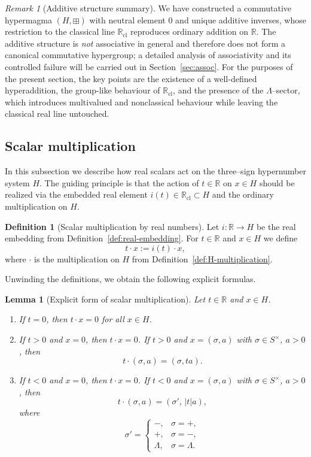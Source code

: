 \documentclass[11pt]{amsart}
\numberwithin{equation}{section}
\newtheorem{lemma}[theorem]{Lemma}
\theoremstyle{definition}
\newtheorem{definition}[theorem]{Definition}
\theoremstyle{remark}
\newtheorem{remark}[theorem]{Remark}
\newcommand{\R}{\mathbb{R}}
\newcommand{\Rc}{\mathbb{R}_{\mathrm{cl}}} %
\newcommand{\Hnum}{H}                      %
\newcommand{\Snon}{S^{\times}}             %
\newcommand{\op}{\boxplus}                 %
\newcommand{\iemb}{i}                      %
\begin{document}
\begin{remark}[Additive structure summary]\label{rem:H-add-summary}
We have constructed a commutative hypermagma $(\Hnum,\op)$ with
neutral element $0$ and unique additive inverses, whose restriction to
the classical line $\Rc$ reproduces ordinary addition on $\R$.  The
additive structure is \emph{not} associative in general and therefore
does not form a canonical commutative hypergroup; a detailed analysis
of associativity and its controlled failure will be carried out in
Section~\ref{sec:assoc}.  For the purposes of the present section, the
key points are the existence of a well-defined hyperaddition, the
group-like behaviour of $\Rc$, and the presence of the $\Lambda$--sector,
which introduces multivalued and nonclassical behaviour while leaving
the classical real line untouched.
\end{remark}

\subsection{Scalar multiplication}
\label{subsec:scalar}

In this subsection we describe how real scalars act on the
three--sign hypernumber system $\Hnum$.  The guiding principle is that
the action of $t\in\R$ on $x\in\Hnum$ should be realized via the
embedded real element $\iemb(t)\in\Rc\subset\Hnum$ and the ordinary
multiplication on $\Hnum$.

\begin{definition}[Scalar multiplication by real numbers]
\label{def:scalar-mult}
Let $\iemb:\R\to\Hnum$ be the real embedding from
Definition~\ref{def:real-embedding}.  For $t\in\R$ and $x\in\Hnum$ we
define
\[
  t\cdot x := \iemb(t)\cdot x,
\]
where $\cdot$ is the multiplication on $\Hnum$ from
Definition~\ref{def:H-multiplication}.
\end{definition}

Unwinding the definitions, we obtain the following explicit formulas.

\begin{lemma}[Explicit form of scalar multiplication]
\label{lem:scalar-explicit}
Let $t\in\R$ and $x\in\Hnum$.
\begin{enumerate}
  \item If $t=0$, then $t\cdot x = 0$ for all $x\in\Hnum$.
  \item If $t>0$ and $x=0$, then $t\cdot x=0$.  If
        $t>0$ and $x=(\sigma,a)$ with $\sigma\in\Snon$, $a>0$, then
  \[
    t\cdot(\sigma,a) = (\sigma,ta).
  \]
  \item If $t<0$ and $x=0$, then $t\cdot x=0$.  If
        $t<0$ and $x=(\sigma,a)$ with $\sigma\in\Snon$, $a>0$, then
  \[
    t\cdot(\sigma,a) =
    (\sigma',\,|t|a),
  \]
  where
  \[
    \sigma' =
    \begin{cases}
      -,       & \sigma=+,\\
      +,       & \sigma=-,\\
      \Lambda, & \sigma=\Lambda.
    \end{cases}
  \]
\end{enumerate}
\end{lemma}
\end{document}
